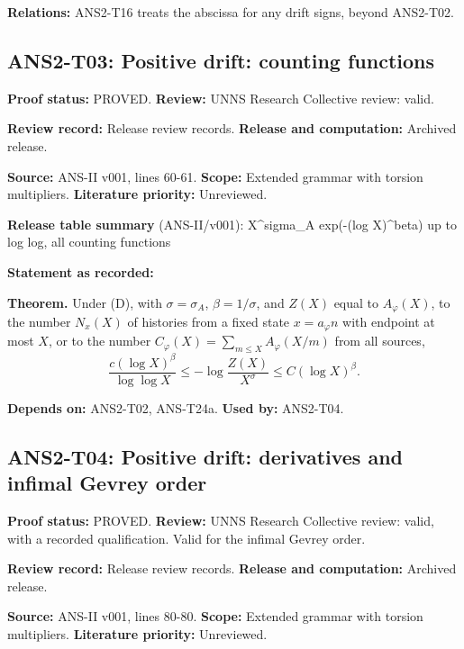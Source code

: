 \documentclass[
  11pt,
]{article}
\begin{document}
\textbf{Relations:} ANS2-T16 treats the abscissa for any drift signs,
beyond ANS2-T02.

\hypertarget{ans2-t03-positive-drift-counting-functions}{%
\subsection{ANS2-T03: Positive drift: counting
functions}\label{ans2-t03-positive-drift-counting-functions}}

\textbf{Proof status:} PROVED. \textbf{Review:} UNNS Research Collective
review: valid.

\textbf{Review record:} Release review records. \textbf{Release and
computation:} Archived release.

\textbf{Source:} ANS-II v001, lines 60-61. \textbf{Scope:} Extended
grammar with torsion multipliers. \textbf{Literature priority:}
Unreviewed.

\textbf{Release table summary} (ANS-II/v001): X\^{}sigma\_A exp(-(log
X)\^{}beta) up to log log, all counting functions

\textbf{Statement as recorded:}

\textbf{Theorem.} Under (D), with \(\sigma=\sigma_A\),
\(\beta=1/\sigma\), and \(Z(X)\) equal to \(A_\varphi(X)\), to the
number \(N_x(X)\) of histories from a fixed state \(x=a_\varphi n\) with
endpoint at most \(X\), or to the number
\(C_\varphi(X)=\sum_{m\le X}A_\varphi(X/m)\) from all sources,
\[\frac{c(\log X)^{\beta}}{\log\log X}\le-\log\frac{Z(X)}{X^{\sigma}}\le C(\log X)^{\beta}.\]

\textbf{Depends on:} ANS2-T02, ANS-T24a. \textbf{Used by:} ANS2-T04.

\hypertarget{ans2-t04-positive-drift-derivatives-and-infimal-gevrey-order}{%
\subsection{ANS2-T04: Positive drift: derivatives and infimal Gevrey
order}\label{ans2-t04-positive-drift-derivatives-and-infimal-gevrey-order}}

\textbf{Proof status:} PROVED. \textbf{Review:} UNNS Research Collective
review: valid, with a recorded qualification. Valid for the infimal
Gevrey order.

\textbf{Review record:} Release review records. \textbf{Release and
computation:} Archived release.

\textbf{Source:} ANS-II v001, lines 80-80. \textbf{Scope:} Extended
grammar with torsion multipliers. \textbf{Literature priority:}
Unreviewed.
\end{document}
